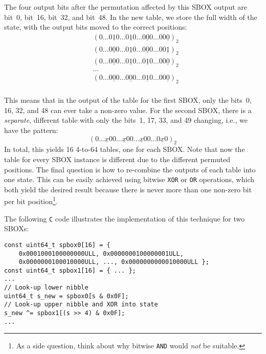 The four output bits after the permutation affected by this \ac{SBOX} output are bit~0, bit~16, bit~32, and bit~48. In the new table, we store the full width of the state, with the output bits moved to the correct positions:  
\begin{align}
	& \left( 0 \ldots 0\underline{1}0 \ldots 0\underline{1}0 \ldots 0\underline{0}0 \ldots 00\underline{0}\right)_2 \nonumber \\ 
	& \left( 0 \ldots 0\underline{0}0 \ldots 0\underline{1}0 \ldots 0\underline{0}0 \ldots 00\underline{1}\right)_2 \nonumber \\ 
	& \left( 0 \ldots 0\underline{0}0 \ldots 0\underline{1}0 \ldots 0\underline{1}0 \ldots 00\underline{0}\right)_2 \nonumber \\ 
	& \ldots \nonumber \\
	& \left( 0 \ldots 0\underline{0}0 \ldots 0\underline{0}0 \ldots 0\underline{1}0 \ldots 00\underline{0}\right)_2 \nonumber \\ 
\end{align}

This means that in the output of the table for the first \ac{SBOX}, only the bits~0, 16, 32, and 48 can ever take a non-zero value. For the second \ac{SBOX}, there is a \emph{separate}, different table with only the bits~1, 17, 33, and 49 changing, i.e., we have the pattern:
$$
\left( 0 \ldots \underline{x}00 \ldots \underline{x}00 \ldots \underline{x}00 \ldots 0\underline{x}0\right)_2
$$
In total, this yields 16 4-to-64 tables, one for each \ac{SBOX}. Note that now the table for every \ac{SBOX} instance is different due to the different permuted positions. The final question is how to re-combine the outputs of each table into one state. This can be easily achieved using bitwise \verb+XOR+ or \verb+OR+ operations, which both yield the desired result because there is never more than one non-zero bit per bit position\footnote{As a side question, think about why bitwise \texttt{AND} would \emph{not} be suitable.}. 

The following \verb+C+ code illustrates the implementation of this technique for two \acp{SBOX}:

\begin{lstlisting}
const uint64_t spbox0[16] = { 
    0x0001000100000000ULL, 0x0000000100000001ULL, 
    0x0000000100010000ULL, ..., 0x0000000000010000ULL };
const uint64_t spbox1[16] = { ... };
...
// Look-up lower nibble
uint64_t s_new = spbox0[s & 0x0F];
// Look-up upper nibble and XOR into state
s_new ^= spbox1[(s >> 4) & 0x0F];
...

\end{lstlisting}


